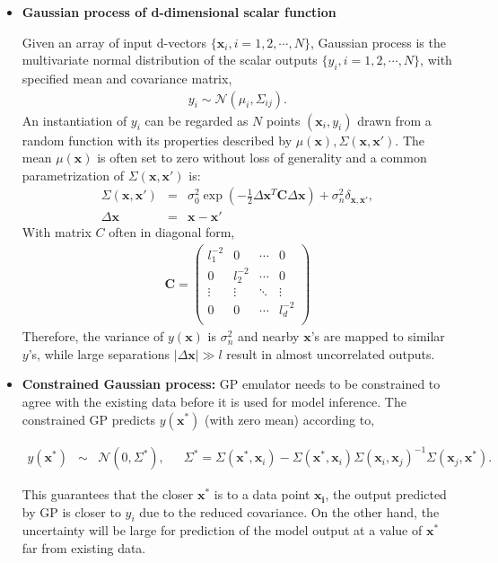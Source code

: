\documentclass[aps,prl,twocolumn,groupedaddress]{revtex4-1}
\begin{document}
	 \begin{itemize}
	 \item {\bf Gaussian process of d-dimensional scalar function}
	 
	 Given an array of input d-vectors $\{\mathbf{x}_i, i = 1, 2, \cdots, N\}$, Gaussian process is the multivariate normal distribution of the scalar outputs $\{y_i, i = 1, 2, \cdots, N\}$,  with specified mean and covariance matrix,
	 \begin{eqnarray}
	 y_i \sim \mathcal{N}(\mu_i, \Sigma_{ij}).
	 \end{eqnarray}
An instantiation of $y_i$ can be regarded as $N$ points $(\mathbf{x}_i, y_i)$ drawn from a random function with its properties described by $\mu(\mathbf{x}), \Sigma(\mathbf{x}, \mathbf{x}')$.  
	The mean $\mu(\mathbf{x})$ is often set to zero without loss of generality and a common parametrization of $\Sigma(\mathbf{x}, \mathbf{x}')$ is:
	\begin{eqnarray}\label{kernel}
		\Sigma(\mathbf{x}, \mathbf{x}') &=& \sigma_0^2\exp\left( -\frac{1}{2}\Delta\mathbf{x}^T \mathbf{C} \Delta\mathbf{x} \right) + \sigma_n^2\delta_{\mathbf{x}, \mathbf{x}'}, \\
		\Delta\mathbf{x} &=& \mathbf{x} - \mathbf{x}'	
	\end{eqnarray}
	With  matrix $C$ often in diagonal form,
	\begin{eqnarray}
		\mathbf{C} = 
		\left(		
		\begin{array}{cccc}
			l_1^{-2} 	& 	0 		&	 \cdots & 0	\\
			0 			& l_2^{-2}	 & 		\cdots & 0	\\
			\vdots 			& \vdots & \ddots & \vdots	\\
			0 			& 		0 & \cdots & l_d^{-2} \\
		\end{array}
		\right)
	\end{eqnarray}
	Therefore, the variance of $y(\mathbf{x})$ is $\sigma_n^2$ and nearby $\mathbf{x}$'s are mapped to similar $y$'s, while large separations $| \Delta \mathbf{x} | \gg l$ result in almost uncorrelated outputs.
	 
	 
	 \item {\bf Constrained Gaussian process:}
	 GP emulator needs to be constrained to agree with the existing data before it is used for model inference.
	 The constrained GP predicts $y(\mathbf{x}^*)$ (with zero mean) according to,\begin{widetext}
	 \begin{eqnarray}
	 	y(\mathbf{x}^*) &\sim& \mathcal{N}\left(0, \Sigma^*\right), 
	 	\phantom{123}
	 	\Sigma^* = \Sigma(\mathbf{x}^*, \mathbf{x}_i) -  \Sigma(\mathbf{x}^*, \mathbf{x}_i) \Sigma(\mathbf{x}_i, \mathbf{x}_j)^{-1} \Sigma(\mathbf{x}_j, \mathbf{x}^*).
	 \end{eqnarray}
\end{widetext}
	 This guarantees that the closer $\mathbf{x}^*$ is to a data point $\mathbf{x_i}$, the output predicted by GP is closer to $y_i$ due to the reduced covariance. 
	 On the other hand, the uncertainty will be large for prediction of the model output at a value of $\mathbf{x}^*$ far from existing data.


\end{itemize}
\end{document}
